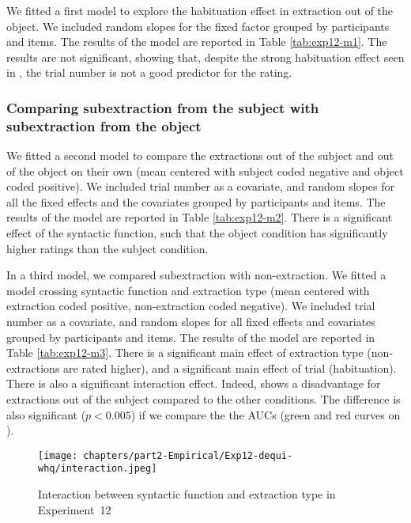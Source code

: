 We fitted a first model to explore the habituation effect in extraction out of the object. We included random slopes for the fixed factor grouped by participants and items. The results of the model are reported in Table \ref{tab:exp12-m1}. 
The results are not significant, showing that, despite the strong habituation effect seen in , the trial number is not a good predictor for the rating.



\subsubsection{Comparing subextraction from the subject with subextraction from the object}

We fitted a second model to compare the extractions out of the subject and out of the object on their own (mean centered with subject coded negative and object coded positive). We included trial number as a covariate, and random slopes for all the fixed effects and the covariates grouped by participants and items. The results of the model are reported in Table \ref{tab:exp12-m2}. 
There is a significant effect of the syntactic function, such that the object condition has significantly higher ratings than the subject condition.



In a third model, we compared subextraction with non-extraction. We fitted a model crossing syntactic function and extraction type (mean centered with extraction coded positive, non-extraction coded negative). We included trial number as a covariate, and random slopes for all fixed effects and covariates grouped by participants and items. The results of the model are reported in Table \ref{tab:exp12-m3}. 
There is a significant main effect of extraction type (non-extractions are rated higher), and a significant main effect of trial (habituation). There is also a significant interaction effect. Indeed,  shows a disadvantage for extractions out of the subject compared to the other conditions. The difference is also significant ($p < 0.005$) if we compare the the AUCs (green and red curves on ). 



\begin{figure}
    \centering
    \texttt{[image: chapters/part2-Empirical/Exp12-dequi-whq/interaction.jpeg]}
    \caption{Interaction between syntactic function and extraction type in Experiment~12}
    \label{fig:exp12-interaction}
\end{figure}

